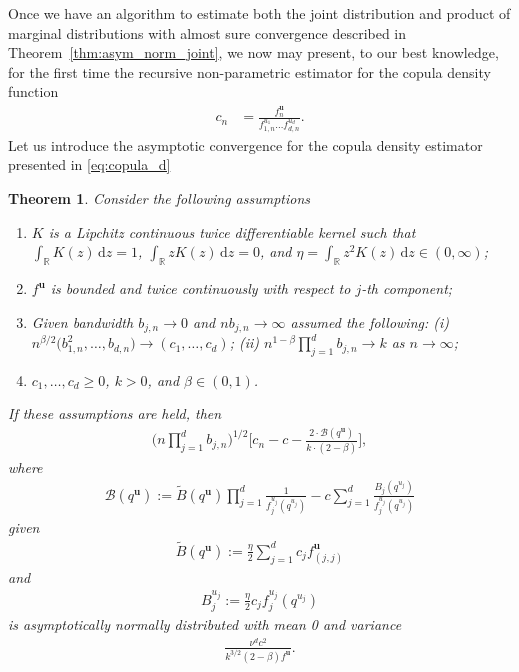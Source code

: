 \documentclass[12pt]{article}
\newtheorem{theorem}{Theorem}
\begin{document}
	Once we have an algorithm to estimate both the joint distribution and product of marginal distributions with almost sure convergence described in Theorem~\ref{thm:asym_norm_joint}, we now may present, to our best knowledge, for the first time the recursive non-parametric estimator for the copula density function
	\begin{align}
		c_n &= \frac{f^{\mathbf{u}}_n}{f^{u_1}_{1, n} \dots  f^{u_d}_{d, n}}. \label{eq:copula_d}
	\end{align}
	Let us introduce the asymptotic convergence for the copula density estimator presented in \eqref{eq:copula_d} 
	\begin{theorem}
		Consider the following assumptions
		\begin{enumerate}
			\item $ K $ is a Lipchitz continuous twice differentiable kernel such that $ \int_\mathbb{R} K(z)\, \text{d}z = 1 $, $ \int_\mathbb{R} zK(z)\, \text{d}z = 0 $, and $\eta = \int_\mathbb{R} z^2K(z)\, \text{d}z \in (0, \infty) $;
			\item $ f^{\mathbf{u}} $ is bounded and twice continuously with respect to $ j $-th component;
			\item Given bandwidth $ b_{j, n} \rightarrow 0 $ and $ nb_{j, n} \rightarrow \infty $ assumed the following: (i) $ n^{\beta/2}\big(b_{1, n}^2, \dots, b_{d, n}\big)\rightarrow (c_1, \dots, c_d) $; (ii) $ n^{1-\beta}\prod_{j=1}^{d}b_{j, n} \rightarrow k $ as $ n \rightarrow \infty $;
			\item $ c_1, \dots, c_d \geq 0 $, $ k > 0 $, and $ \beta \in (0, 1) $.
		\end{enumerate}
		If these assumptions are held, then 
		\begin{align}
			\Bigg(n\prod_{j=1}^{d}b_{j, n}\Bigg)^{1/2} \Bigg[c_n -c - \frac{2\cdot\mathcal{B}(q^{\mathbf{u}})}{k\cdot(2-\beta)}\Bigg], 
		\end{align}
		where 
		\begin{align}
			\mathcal{B}(q^{\mathbf{u}}) := \widetilde{B}(q^{\mathbf{u}})\prod_{j=1}^{d}\frac{1}{f_j^{u_j}(q^{u_j})} - c \sum_{j=1}^{d} \frac{B_j(q^{u_j})}{f_j^{u_j}(q^{u_j})}
		\end{align}
		given
		\begin{align}
			\widetilde{B}(q^{\mathbf{u}}) := \frac{\eta}{2}\sum_{j=1}^{d}c_j f^{\mathbf{u}}_{(j, j)}
		\end{align}
		and
		\begin{align}
			B_j^{u_j} := \frac{\eta}{2} c_j f_j^{u_j}(q^{u_j})
		\end{align}
		is asymptotically normally distributed with mean 0 and variance 
		\begin{align}
			\frac{\nu^dc^2}{k^{3/2}(2-\beta)f^{\mathbf{u}}}.
		\end{align}
	\end{theorem}
	
\end{document}
